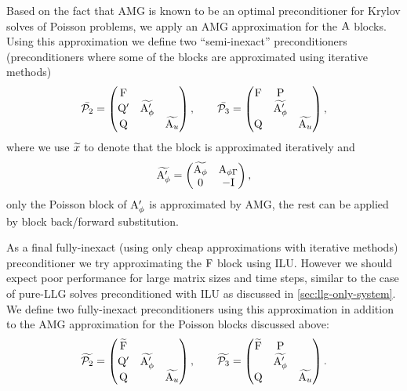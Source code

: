 Based on the fact that AMG is known to be an optimal preconditioner for Krylov solves of Poisson problems, we apply an AMG approximation for the $\mathrm{A}$ blocks.
Using this approximation we define two ``semi-inexact'' preconditioners (\ie preconditioners where some of the blocks are approximated using iterative methods)
\begin{equation}
  \bar{\mathcal{P}_2} =
  \begin{pmatrix}
    \mathrm{F}       &           &  \\
    \mathrm{Q}'       & \widetilde{\mathrm{A}_\phi'} &   \\
    \mathrm{Q}       &           &   \widetilde{\mathrm{A}_u}
  \end{pmatrix},
  \qquad
  \bar{\mathcal{P}_3} =
  \begin{pmatrix}
    \mathrm{F}       & \mathrm{P}       &  \\
    & \widetilde{\mathrm{A}_\phi'} &   \\
    \mathrm{Q}       &           &  \widetilde{\mathrm{A}_u}
  \end{pmatrix},
  \label{eq:ms-block-prec-drop-p}
\end{equation}
where we use $\widetilde{x}$ to denote that the block is approximated iteratively and
\begin{equation}
  \widetilde{\mathrm{A}_\phi'} =
  \begin{pmatrix}
    \widetilde{\mathrm{A}_\phi}     & \mathrm{A}_{\phi{\Gamma}} \\
    0      & -\mathrm{I}
  \end{pmatrix},
\end{equation}
\ie only the Poisson block of $\mathrm{A}_\phi'$ is approximated by AMG, the rest can be applied by block back/forward substitution.

As a final fully-inexact (\ie using only cheap approximations with iterative methods) preconditioner we try approximating the $\mathrm{F}$ block using ILU.
However we should expect poor performance for large matrix sizes and time steps, similar to the case of pure-LLG solves preconditioned with ILU as discussed in \cref{sec:llg-only-system}.
We define two fully-inexact preconditioners using this approximation in addition to the AMG approximation for the Poisson blocks discussed above:
\begin{equation}
  \widetilde{\mathcal{P}_2} =
  \begin{pmatrix}
    \widetilde{\mathrm{F}} &           &  \\
    \mathrm{Q}'       & \widetilde{\mathrm{A}_\phi'} &   \\
    \mathrm{Q}       &           &   \widetilde{\mathrm{A}_u}
  \end{pmatrix},
  \qquad
  \widetilde{\mathcal{P}_3} =
  \begin{pmatrix}
   \widetilde{\mathrm{F}}       & \mathrm{P}       &  \\
    & \widetilde{\mathrm{A}_\phi'} &   \\
    \mathrm{Q}       &           &  \widetilde{\mathrm{A}_u}
  \end{pmatrix}.
  \label{eq:ms-block-prec-drop-p}
\end{equation}


